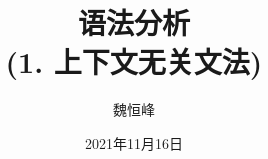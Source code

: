 \documentclass[]{beamer}
\title[语法分析]{语法分析 \\ (1. 上下文无关文法)}
\author[魏恒峰]{\large 魏恒峰}
\institute{hfwei@nju.edu.cn}
\date{2021年11月16日}
\begin{document}
\maketitle



\thankyou{}

\end{document}
